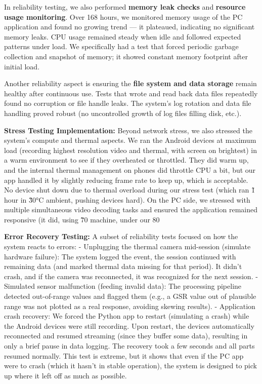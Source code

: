 \documentclass[11pt,a4paper]{report}
\begin{document}
{In reliability testing, we also performed \textbf{memory leak checks} and
\textbf{resource usage monitoring}. Over 168 hours, we monitored memory usage
of the PC application and found no growing trend --- it plateaued,
indicating no significant memory leaks. CPU usage remained steady when
idle and followed expected patterns under load. We specifically had a
test that forced periodic garbage collection and snapshot of memory; it
showed constant memory footprint after initial load.

Another reliability aspect is ensuring the \textbf{file system and data
storage} remain healthy after continuous use. Tests that wrote and read
back data files repeatedly found no corruption or file handle leaks. The
system's log rotation and data file handling proved robust (no
uncontrolled growth of log files filling disk, etc.).

\textbf{Stress Testing Implementation:} Beyond network stress, we also
stressed the system's compute and thermal aspects. We ran the Android
devices at maximum load (recording highest resolution video and thermal,
with screen on brightest) in a warm environment to see if they
overheated or throttled. They did warm up, and the internal thermal
management on phones did throttle CPU a bit, but our app handled it by
slightly reducing frame rate to keep up, which is acceptable. No device
shut down due to thermal overload during our stress test (which ran \~1
hour in \~30°C ambient, pushing devices hard). On the PC side, we
stressed with multiple simultaneous video decoding tasks and ensured the
application remained responsive (it did, using \~70%
machine, under our 80%

\textbf{Error Recovery Testing:} A subset of reliability tests focused on how
the system reacts to errors: - Unplugging the thermal camera mid-session
(simulate hardware failure): The system logged the event, the session
continued with remaining data (and marked thermal data missing for that
period). It didn't crash, and if the camera was reconnected, it was
recognized for the next session. - Simulated sensor malfunction (feeding
invalid data): The processing pipeline detected out-of-range values and
flagged them (e.g., a GSR value out of plausible range was not plotted
as a real response, avoiding skewing results). - Application crash
recovery: We forced the Python app to restart (simulating a crash) while
the Android devices were still recording. Upon restart, the devices
automatically reconnected and resumed streaming (since they buffer some
data), resulting in only a brief pause in data logging. The recovery
took a few seconds and all parts resumed normally. This test is extreme,
but it shows that even if the PC app were to crash (which it hasn't in
stable operation), the system is designed to pick up where it left off
as much as possible.

}
\end{document}
